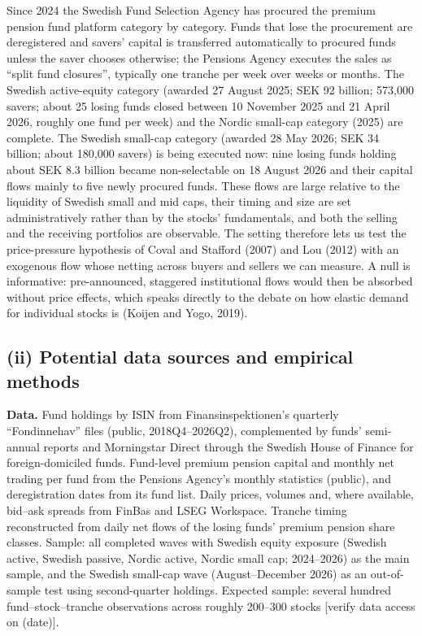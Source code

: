 \documentclass[12pt,a4paper]{article}
\begin{document}
Since 2024 the Swedish Fund Selection Agency has procured the premium pension fund platform category by category. Funds that lose the procurement are deregistered and savers' capital is transferred automatically to procured funds unless the saver chooses otherwise; the Pensions Agency executes the sales as ``split fund closures'', typically one tranche per week over weeks or months. The Swedish active-equity category (awarded 27 August 2025; SEK 92 billion; 573,000 savers; about 25 losing funds closed between 10 November 2025 and 21 April 2026, roughly one fund per week) and the Nordic small-cap category (2025) are complete. The Swedish small-cap category (awarded 28 May 2026; SEK 34 billion; about 180,000 savers) is being executed now: nine losing funds holding about SEK 8.3 billion became non-selectable on 18 August 2026 and their capital flows mainly to five newly procured funds. These flows are large relative to the liquidity of Swedish small and mid caps, their timing and size are set administratively rather than by the stocks' fundamentals, and both the selling and the receiving portfolios are observable. The setting therefore lets us test the price-pressure hypothesis of Coval and Stafford (2007) and Lou (2012) with an exogenous flow whose netting across buyers and sellers we can measure. A null is informative: pre-announced, staggered institutional flows would then be absorbed without price effects, which speaks directly to the debate on how elastic demand for individual stocks is (Koijen and Yogo, 2019).

\subsection{(ii) Potential data sources and empirical methods}

\textbf{Data.} Fund holdings by ISIN from Finansinspektionen's quarterly ``Fondinnehav'' files (public, 2018Q4--2026Q2), complemented by funds' semi-annual reports and Morningstar Direct through the Swedish House of Finance for foreign-domiciled funds. Fund-level premium pension capital and monthly net trading per fund from the Pensions Agency's monthly statistics (public), and deregistration dates from its fund list. Daily prices, volumes and, where available, bid--ask spreads from FinBas and LSEG Workspace. Tranche timing reconstructed from daily net flows of the losing funds' premium pension share classes. Sample: all completed waves with Swedish equity exposure (Swedish active, Swedish passive, Nordic active, Nordic small cap; 2024--2026) as the main sample, and the Swedish small-cap wave (August--December 2026) as an out-of-sample test using second-quarter holdings. Expected sample: several hundred fund--stock--tranche observations across roughly 200--300 stocks [verify data access on (date)].
\end{document}
